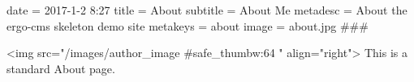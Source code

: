 date = 2017-1-2 8:27
title = About
subtitle = About Me
metadesc = About the ergo-cms skeleton demo site
metakeys = about
image = about.jpg
###

<img src="/images/{{author_image #safe_thumb{w:64} }}" align="right"> This is a standard About page. 


